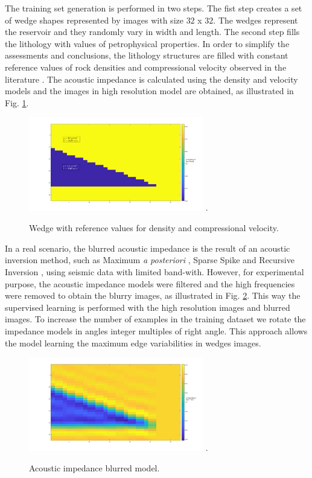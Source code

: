 \documentclass[conference,compsoc]{IEEEtran}
\begin{document}
The training set generation is performed in two steps.
The fist step creates a set of wedge shapes represented
by images with size $32$ x $32$. The wedges represent the reservoir and they
randomly vary in width and length. The second step fills the lithology with values of petrophysical properties.
In order to simplify the assessments and conclusions, the lithology structures are filled with constant
reference values of rock densities and compressional velocity observed in the literature \cite{Mavko2009}.
The acoustic impedance is calculated using the density and velocity models and the images in high
resolution model are obtained, as illustrated in  Fig. \ref{fig_lithology}.
\begin{figure}[!t]
\centering
\includegraphics[width=3.0in]{Figs/Image_Paper}
\DeclareGraphicsExtensions.
\caption{Wedge with reference values for density and compressional velocity.}
\label{fig_lithology}
\end{figure}
In a real scenario, the blurred acoustic impedance is the
result of an acoustic inversion method, such as Maximum \textit{a posteriori} \cite{Buland2003,Figueiredo2012}, Sparse Spike \cite{Debeye1990} 
and Recursive Inversion \cite{Chopra2001}, using seismic data with limited band-with.
However, for experimental purpose, the acoustic impedance models were filtered
and the high frequencies were removed to obtain the blurry images, as illustrated in Fig. \ref{fig_blur}.
This way the supervised learning is performed with the high resolution images and blurred images.
To increase the number of examples in the training dataset we rotate
the impedance models in angles integer multiples of right angle. This approach allows the model learning the maximum edge variabilities
in wedges images.
\begin{figure}[!t]
\centering
\includegraphics[width=3.0in]{Figs/Image_Paper_blurred}
\DeclareGraphicsExtensions.
\caption{Acoustic impedance blurred model.}
\label{fig_blur}
\end{figure}
\end{document}
